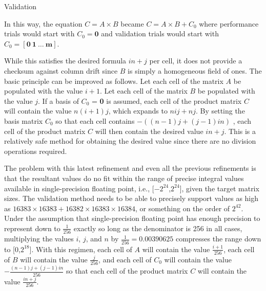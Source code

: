 \documentclass{article}
\begin{document}
\begin{section}{Validation}
\begin{paragraph}{}
    In this way, the equation $C = A \times B$ became $C = A \times B + C_{0}$ where performance trials would start with
    $C_{0} = \textbf{0}$ and validation trials would start with $C_{0} = [\textbf{0}\ \textbf{1}\ \ldots\ \textbf{m}]$.
  \end{paragraph}
  \begin{paragraph}{}
    While this satisfies the desired formula $in + j$ per cell, it does not provide a checksum against column drift
    since $B$ is simply a homogeneous field of ones. The basic principle can be improved as follows. Let each cell of the matrix
    $A$ be populated with the value $i + 1$. Let each cell of the matrix $B$ be populated with the value $j$. If a basis
    of $C_{0}$ = \textbf{0} is assumed, each cell of the product matrix $C$ will contain the value $n(i + 1)j$, which expands to
    $nij + nj$. By setting the basis matrix $C_{0}$ so that each cell contains $-((n-1)j + (j-1)in)$ , each cell of the product matrix $C$
    will then contain the desired value $in + j$. This is a relatively safe method for obtaining the desired value since there are no
    division operations required.
  \end{paragraph}
  \begin{paragraph}{}
    The problem with this latest refinement and even all the previous refinements is that the resultant values do no fit within the range of precise integral
    values available in single-precision floating point, i.e., [$-2^{24}$,$2^{24}$]\autocite{SPIntLimit}, given the target matrix sizes. The validation
    method needs to be able to precisely support values as high as $16383 \times 16383 + 16382 \times 16383 \times 16384$, or something on the order
    of $2^{42}$. Under the assumption that single-precision floating point has enough precision to represent down to $\frac{1}{256}$ exactly so long as the
    denominator is 256 in all cases, multiplying the values $i$, $j$, and $n$ by $\frac{1}{256} = 0.00390625$ compresses the range down to [0,$2^{18}$].
    With this regimen, each cell of $A$ will contain the value $\frac{i+1}{256}$, each cell of $B$ will contain the value $\frac{j}{256}$, and
    each cell of $C_{0}$ will contain the value $-\frac{(n-1)j + (j-1)in}{256}$ so that each cell of the product matrix $C$ will contain the value $\frac{in + j}{256}$.
  \end{paragraph}
 \end{section}

\printbibliography
\end{document}

